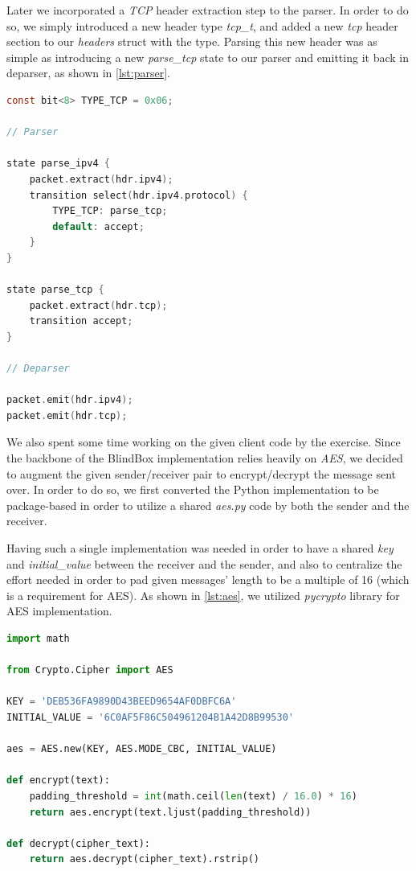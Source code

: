 \documentclass{winslabreport}
\begin{document}
Later we incorporated a \emph{TCP} header extraction step to the parser. In order to do so, we simply introduced a new header type \emph{tcp\_t}, and added a new \emph{tcp} header section to our \emph{headers} struct with the type. Parsing this new header was as simple as introducing a new \emph{parse\_tcp} state to our parser and emitting it back in deparser, as shown in \autoref{lst:parser}.

\begin{lstlisting}[caption={P4 parser snippet},label={lst:parser},language=C]
const bit<8> TYPE_TCP = 0x06;

// Parser

state parse_ipv4 {
    packet.extract(hdr.ipv4);
    transition select(hdr.ipv4.protocol) {
        TYPE_TCP: parse_tcp;
        default: accept;
    }
}

state parse_tcp {
    packet.extract(hdr.tcp);
    transition accept;
}

// Deparser

packet.emit(hdr.ipv4);
packet.emit(hdr.tcp);
\end{lstlisting}

We also spent some time working on the given client code by the exercise. Since the backbone of the BlindBox implementation relies heavily on \emph{AES}, we decided to augment the given sender/receiver pair to encrypt/decrypt the message sent over. In order to do so, we first converted the Python implementation to be package-based in order to utilize a shared \emph{aes.py} code by both the sender and the receiver. 

Having such a single implementation was needed in order to have a shared \emph{key} and \emph{initial\_value} between the receiver and the sender, and also to centralize the effort needed in order to pad given messages' length to be a multiple of 16 (which is a requirement for AES). As shown in \autoref{lst:aes}, we utilized \emph{pycrypto} library for AES implementation.

\begin{lstlisting}[caption={AES encryption/decryption},label={lst:aes},language=Python]
import math

from Crypto.Cipher import AES

KEY = 'DEB536FA9890D43BEED9654AF0DBFC6A'
INITIAL_VALUE = '6C0AF5F86C504961204B1A42D8B99530'

aes = AES.new(KEY, AES.MODE_CBC, INITIAL_VALUE)

def encrypt(text):
    padding_threshold = int(math.ceil(len(text) / 16.0) * 16)
    return aes.encrypt(text.ljust(padding_threshold))

def decrypt(cipher_text):
    return aes.decrypt(cipher_text).rstrip()
\end{lstlisting}
\end{document}

